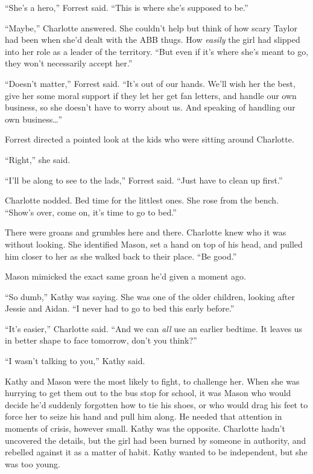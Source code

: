 ``She's a hero,'' Forrest said.  ``This is where she's supposed to be.''



``Maybe,'' Charlotte answered.  She couldn't help but think of how scary Taylor had been when she'd dealt with the ABB thugs.  How \emph{easily} the girl had slipped into her role as a leader of the territory.  ``But even if it's where she's meant to go, they won't necessarily accept her.''



``Doesn't matter,'' Forrest said.  ``It's out of our hands.  We'll wish her the best, give her some moral support if they let her get fan letters, and handle our own business, so she doesn't have to worry about us.  And speaking of handling our own business\ldots''



Forrest directed a pointed look at the kids who were sitting around Charlotte.



``Right,'' she said.



``I'll be along to see to the lads,'' Forrest said.  ``Just have to clean up first.''



Charlotte nodded.  Bed time for the littlest ones.  She rose from the bench.  ``Show's over, come on, it's time to go to bed.''



There were groans and grumbles here and there.  Charlotte knew who it was without looking.  She identified Mason, set a hand on top of his head, and pulled him closer to her as she walked back to their place.  ``Be good.''



Mason mimicked the exact same groan he'd given a moment ago.



``So dumb,'' Kathy was saying.  She was one of the older children, looking after Jessie and Aidan.  ``I never had to go to bed this early before.''



``It's easier,'' Charlotte said.  ``And we can \emph{all} use an earlier bedtime.  It leaves us in better shape to face tomorrow, don't you think?''



``I wasn't talking to you,'' Kathy said.



Kathy and Mason were the most likely to fight, to challenge her.  When she was hurrying to get them out to the bus stop for school, it was Mason who would decide he'd suddenly forgotten how to tie his shoes, or who would drag his feet to force her to seize his hand and pull him along.  He needed that attention in moments of crisis, however small.  Kathy was the opposite.  Charlotte hadn't uncovered the details, but the girl had been burned by someone in authority, and rebelled against it as a matter of habit.  Kathy wanted to be independent, but she was too young.



